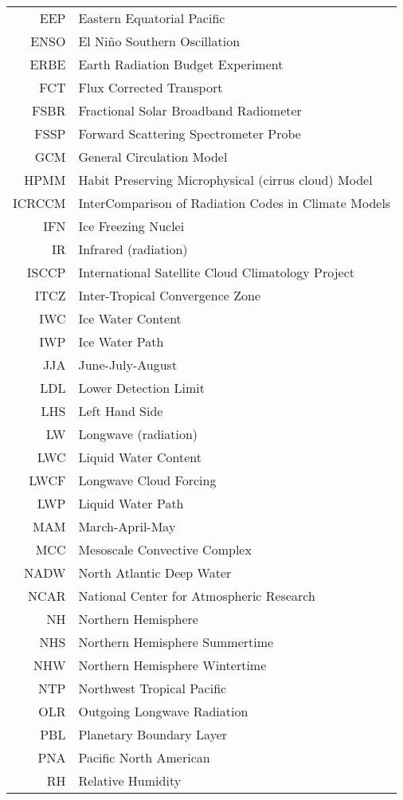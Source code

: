 \begin{longtable}[l]{r l}
EEP & Eastern Equatorial Pacific \\
ENSO & El Ni\~no Southern Oscillation \\
ERBE & Earth Radiation Budget Experiment \\
FCT & Flux Corrected Transport \\
FSBR & Fractional Solar Broadband Radiometer \\
FSSP & Forward Scattering Spectrometer Probe \\
GCM & General Circulation Model \\
HPMM & Habit Preserving Microphysical (cirrus cloud) Model \\ 
ICRCCM & InterComparison of Radiation Codes in Climate Models \\
IFN & Ice Freezing Nuclei \\
IR & Infrared (radiation) \\
ISCCP & International Satellite Cloud Climatology Project \\
ITCZ & Inter-Tropical Convergence Zone \\
IWC & Ice Water Content \\
IWP & Ice Water Path \\
JJA & June-July-August \\
LDL & Lower Detection Limit \\
LHS & Left Hand Side \\
LW & Longwave (radiation) \\
LWC & Liquid Water Content \\
LWCF & Longwave Cloud Forcing \\
LWP & Liquid Water Path \\
MAM & March-April-May \\
MCC & Mesoscale Convective Complex \\
NADW & North Atlantic Deep Water \\
NCAR & National Center for Atmospheric Research \\
NH & Northern Hemisphere \\
NHS & Northern Hemisphere Summertime \\
NHW & Northern Hemisphere Wintertime \\
NTP & Northwest Tropical Pacific \\
OLR & Outgoing Longwave Radiation \\
PBL & Planetary Boundary Layer \\
PNA & Pacific North American \\
RH & Relative Humidity \\

\end{longtable}
